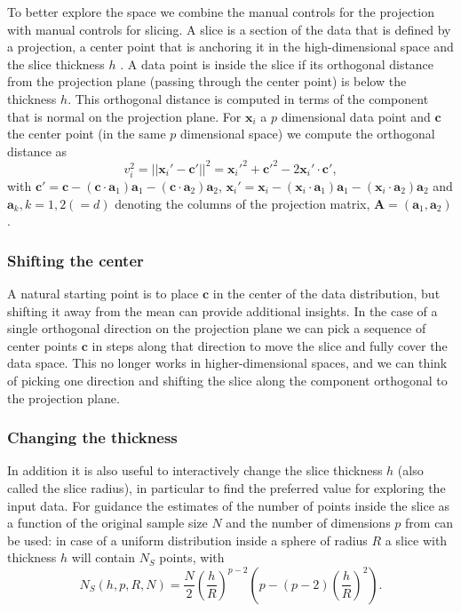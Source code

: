 \documentclass[]{interact}
\theoremstyle{plain}%
\theoremstyle{definition}
\theoremstyle{remark}
\begin{document}
To better explore the space we combine the manual controls for the
projection with manual controls for slicing. A slice is a section of the
data that is defined by a projection, a center point that is anchoring
it in the high-dimensional space and the slice thickness \(h\)
\citep{slicetour}. A data point is inside the slice if its orthogonal
distance from the projection plane (passing through the center point) is
below the thickness \(h\). This orthogonal distance is computed in terms
of the component that is normal on the projection plane. For
\(\mathbf{x}_i\) a \(p\) dimensional data point and \(\mathbf{c}\) the
center point (in the same \(p\) dimensional space) we compute the
orthogonal distance as \begin{equation}
v_i^2 = ||\mathbf{x}_i' - \mathbf{c}'||^2 = \mathbf{x}_i'^2 + \mathbf{c}'^2 - 2 \mathbf{x}_i'\cdot\mathbf{c}' ,
\label{eq:slice}
\end{equation} with
\(\mathbf{c}' = \mathbf{c} - (\mathbf{c}\cdot \mathbf{a}_1) \mathbf{a}_1 - (\mathbf{c}\cdot \mathbf{a}_2 )\mathbf{a}_2\),
\(\mathbf{x}_i' = \mathbf{x}_i - (\mathbf{x}_i\cdot \mathbf{a}_1) \mathbf{a}_1 - (\mathbf{x}_i\cdot \mathbf{a}_2) \mathbf{a}_2\)
and \(\mathbf{a}_k, k=1,2 (=d)\) denoting the columns of the projection
matrix, \(\mathbf{A}=(\mathbf{a}_1, \mathbf{a}_2)\).

\hypertarget{shifting-the-center}{%
\subsubsection{Shifting the center}\label{shifting-the-center}}

A natural starting point is to place \(\mathbf{c}\) in the center of the
data distribution, but shifting it away from the mean can provide
additional insights. In the case of a single orthogonal direction on the
projection plane we can pick a sequence of center points \(\mathbf{c}\)
in steps along that direction to move the slice and fully cover the data
space. This no longer works in higher-dimensional spaces, and we can
think of picking one direction and shifting the slice along the
component orthogonal to the projection plane.

\hypertarget{changing-the-thickness}{%
\subsubsection{Changing the thickness}\label{changing-the-thickness}}

In addition it is also useful to interactively change the slice
thickness \(h\) (also called the slice radius), in particular to find
the preferred value for exploring the input data. For guidance the
estimates of the number of points inside the slice as a function of the
original sample size \(N\) and the number of dimensions \(p\) from
\citet{sectionpursuit} can be used: in case of a uniform distribution
inside a sphere of radius \(R\) a slice with thickness \(h\) will
contain \(N_S\) points, with \begin{equation}
N_S(h, p, R, N) = \frac{N}{2} \left(\frac{h}{R}\right)^{p-2} \left(p - (p-2)\left(\frac{h}{R}\right)^{2}\right).
\label{eq:count}
\end{equation}
\end{document}
